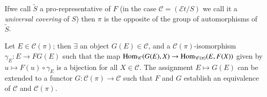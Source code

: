 If\pageoriginale we call $\widetilde{S}$ a pro-representative of $F$
(in the case $\mathscr{C}=(\mathscr{E}t/S)$ we call it a {\em
  universal covering} of $S$) then $\pi$ is the opposite of the group
of automorphisms of $\widetilde{S}$.

\setcounter{sublemma}{9}
\begin{sublemma}\label{lem4.4.1.10}
Let $E\in\mathscr{C}(\pi)$; then $\exists$ an object
$G(E)\in\mathscr{C}$, and a $\mathscr{C}(\pi)$-isomorphism
$\gamma_{E}:E\to FG(E)$ such that the map
$\Hom_{\mathscr{C}}(G(E),X)\break \to \Hom_{\mathscr{C(\pi)}}(E,F(X))$ given
by $u\mapsto F(u)\circ\gamma_{E}$ is a bijection for all
$X\in\mathscr{C}$. The assignment $E\mapsto G(E)$ can be extended to a
functor $G:\mathscr{C}(\pi)\to\mathscr{C}$ such that $F$ and $G$
establish an equivalence of $\mathscr{C}$ and $\mathscr{C}(\pi)$.
\end{sublemma}

